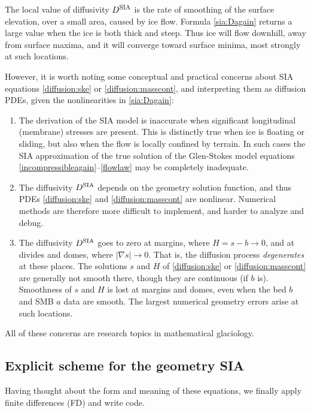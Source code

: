 \documentclass[letterpaper,final,12pt,reqno]{amsart}
\newcommand{\grad}{\nabla}
\newcommand{\Dsia}{D^{\text{\textrm{SIA}}}}
\begin{document}
The local value of diffusivity $\Dsia$ is the rate of smoothing of the surface elevation, over a small area, caused by ice flow.  Formula \eqref{sia:Dagain} returns a large value when the ice is both thick and steep.  Thus ice will flow downhill, away from surface maxima, and it will converge toward surface minima, most strongly at such locations.

However, it is worth noting some conceptual and practical concerns about SIA equations \eqref{diffusion:ske} or \eqref{diffusion:masscont}, and interpreting them as diffusion PDEs, given the nonlinearities in \eqref{sia:Dagain}:
\renewcommand{\labelenumi}{\emph{\roman{enumi})}}
\begin{enumerate}
\item The derivation of the SIA model is inaccurate when significant longitudinal (membrane) stresses are present.  This is distinctly true when ice is floating or sliding, but also when the flow is locally confined by terrain.  In such cases the SIA approximation of the true solution of the Glen-Stokes model equations \eqref{incompressibleagain}--\eqref{flowlaw} may be completely inadequate.
\item The diffusivity $\Dsia$ depends on the geometry solution function, and thus PDEs \eqref{diffusion:ske} and \eqref{diffusion:masscont} are nonlinear.  Numerical methods are therefore more difficult to implement, and harder to analyze and debug.
\item The diffusivity $\Dsia$ goes to zero at margins, where $H=s-b\to 0$, and at divides and domes, where $|\grad s|\to 0$.  That is, the diffusion process \emph{degenerates} at these places.  The solutions $s$ and $H$ of \eqref{diffusion:ske} or \eqref{diffusion:masscont} are generally not smooth there, though they are continuous (if $b$ is).  Smoothness of $s$ and $H$ is lost at margins and domes, even when the bed $b$ and SMB $a$ data are smooth.  The largest numerical geometry errors arise at such locations.
\end{enumerate}
All of these concerns are research topics in mathematical glaciology.

\subsection*{Explicit scheme for the geometry SIA}  Having thought about the form and meaning of these equations, we finally apply finite differences (FD) and write code.
\end{document}
